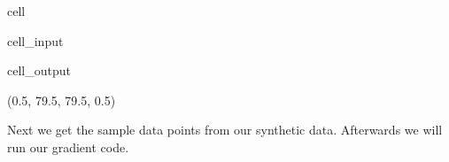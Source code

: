 \documentclass[letterpaper,10pt,english]{jupyterBook}
\begin{document}
\begin{sphinxuseclass}{cell}\begin{sphinxVerbatimInput}

\begin{sphinxuseclass}{cell_input}
\begin{sphinxVerbatim}[commandchars=\\\{\}]
  
\end{sphinxVerbatim}

\end{sphinxuseclass}\end{sphinxVerbatimInput}
\begin{sphinxVerbatimOutput}

\begin{sphinxuseclass}{cell_output}
\begin{sphinxVerbatim}[commandchars=\\\{\}]
(\PYGZhy{}0.5, 79.5, 79.5, \PYGZhy{}0.5)
\end{sphinxVerbatim}

\noindent{}

\end{sphinxuseclass}\end{sphinxVerbatimOutput}

\end{sphinxuseclass}
\sphinxAtStartPar
Next we get the sample data points from our synthetic data. Afterwards we will run our gradient code.
\end{document}
